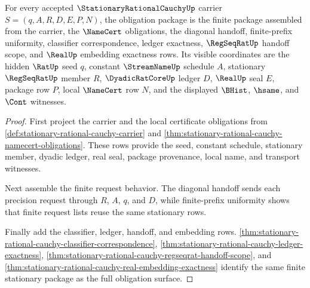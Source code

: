 \begin{theorem}
\label{thm:stationary-rational-cauchy-obligation-package}
For every accepted $\StationaryRationalCauchyUp$ carrier $S=(q,A,R,D,E,P,N)$, the obligation package is the finite package assembled from the carrier, the $\NameCert$ obligations, the diagonal handoff, finite-prefix uniformity, classifier correspondence, ledger exactness, $\RegSeqRatUp$ handoff scope, and $\RealUp$ embedding exactness rows. Its visible coordinates are the hidden $\RatUp$ seed $q$, constant $\StreamNameUp$ schedule $A$, stationary $\RegSeqRatUp$ member $R$, $\DyadicRatCoreUp$ ledger $D$, $\RealUp$ seal $E$, package row $P$, local $\NameCert$ row $N$, and the displayed $\BHist$, $\hsame$, and $\Cont$ witnesses.
\end{theorem}
\begin{proof}
First project the carrier and the local certificate obligations from \autoref{def:stationary-rational-cauchy-carrier} and \autoref{thm:stationary-rational-cauchy-namecert-obligations}. These rows provide the seed, constant schedule, stationary member, dyadic ledger, real seal, package provenance, local name, and transport witnesses.

Next assemble the finite request behavior. The diagonal handoff sends each precision request through $R$, $A$, $q$, and $D$, while finite-prefix uniformity shows that finite request lists reuse the same stationary rows.

Finally add the classifier, ledger, handoff, and embedding rows. \autoref{thm:stationary-rational-cauchy-classifier-correspondence}, \autoref{thm:stationary-rational-cauchy-ledger-exactness}, \autoref{thm:stationary-rational-cauchy-regseqrat-handoff-scope}, and \autoref{thm:stationary-rational-cauchy-real-embedding-exactness} identify the same finite stationary package as the full obligation surface.
\end{proof}

